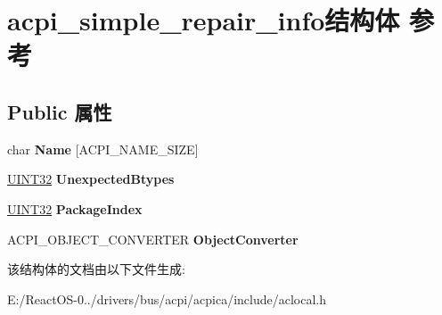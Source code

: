 \hypertarget{structacpi__simple__repair__info}{}\section{acpi\+\_\+simple\+\_\+repair\+\_\+info结构体 参考}
\label{structacpi__simple__repair__info}
\subsection*{Public 属性}
\begin{DoxyCompactItemize}
\item 
\mbox{\label{structacpi__simple__repair__info_abdf1145de6db75da0327b76c090c790d}} 
char {\bfseries Name} \mbox{[}A\+C\+P\+I\+\_\+\+N\+A\+M\+E\+\_\+\+S\+I\+ZE\mbox{]}
\item 
\mbox{\label{structacpi__simple__repair__info_a70acef8a9503572f8b7ffe41ceff60bf}} 
\hyperlink{_processor_bind_8h_ae1e6edbbc26d6fbc71a90190d0266018}{U\+I\+N\+T32} {\bfseries Unexpected\+Btypes}
\item 
\mbox{\label{structacpi__simple__repair__info_a51200bbcfdabfea50a03f596fb0ad71b}} 
\hyperlink{_processor_bind_8h_ae1e6edbbc26d6fbc71a90190d0266018}{U\+I\+N\+T32} {\bfseries Package\+Index}
\item 
\mbox{\label{structacpi__simple__repair__info_ab02842db1ac482f7797379fc8191582a}} 
A\+C\+P\+I\+\_\+\+O\+B\+J\+E\+C\+T\+\_\+\+C\+O\+N\+V\+E\+R\+T\+ER {\bfseries Object\+Converter}
\end{DoxyCompactItemize}


该结构体的文档由以下文件生成\+:\begin{DoxyCompactItemize}
\item 
E\+:/\+React\+O\+S-\/0../drivers/bus/acpi/acpica/include/aclocal.\+h\end{DoxyCompactItemize}
